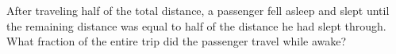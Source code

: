After traveling half of the total distance, a passenger fell asleep and slept until the remaining distance was equal to half of the distance he had slept through. What fraction of the entire trip did the passenger travel while awake?
